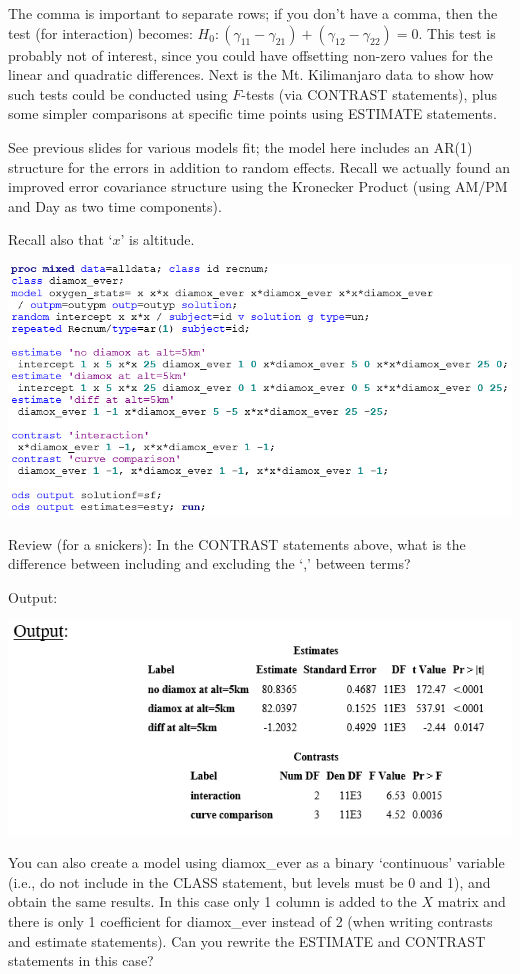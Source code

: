 \documentclass[
  9pt,
  ignorenonframetext,
]{beamer}
\begin{document}
\begin{frame}{}
\protect\hypertarget{section-12}{}
The comma is important to separate rows; if you don't have a comma, then
the test (for interaction) becomes:
\(H_0: (\gamma _11-\gamma _21)+(\gamma _12-\gamma _22)=0\). This test is
probably not of interest, since you could have offsetting non-zero
values for the linear and quadratic differences. Next is the Mt.
Kilimanjaro data to show how such tests could be conducted using
\(F\)-tests (via CONTRAST statements), plus some simpler comparisons at
specific time points using ESTIMATE statements.

See previous slides for various models fit; the model here includes an
AR(1) structure for the errors in addition to random effects. Recall we
actually found an improved error covariance structure using the
Kronecker Product (using AM/PM and Day as two time components).
\end{frame}

\begin{frame}{}
\protect\hypertarget{section-13}{}
Recall also that `\(x\)' is altitude.

\begin{center}\includegraphics[width=0.7\linewidth]{figs_L19/f6} \end{center}

Review (for a snickers): In the CONTRAST statements above, what is the
difference between including and excluding the `,' between terms?
\end{frame}

\begin{frame}{Output:}
\protect\hypertarget{output}{}
\begin{center}\includegraphics[width=0.7\linewidth]{figs_L19/f7} \end{center}

You can also create a model using diamox\_ever as a binary `continuous'
variable (i.e., do not include in the CLASS statement, but levels must
be 0 and 1), and obtain the same results. In this case only 1 column is
added to the \(X\) matrix and there is only 1 coefficient for
diamox\_ever instead of 2 (when writing contrasts and estimate
statements). Can you rewrite the ESTIMATE and CONTRAST statements in
this case?
\end{frame}
\end{document}
